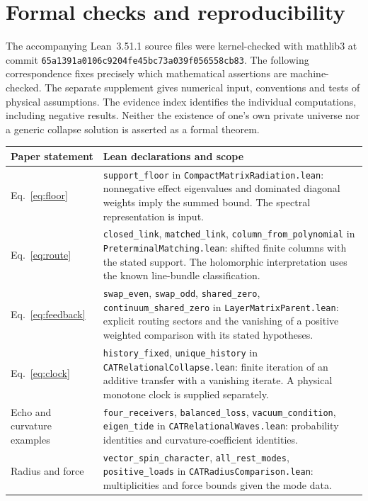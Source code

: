 \appendix
\section{Formal checks and reproducibility}\label{sec:verification}
The accompanying Lean~3.51.1 source files were kernel-checked with mathlib3 at commit \texttt{65a1391a0106c9204fe45bc73a039f056558cb83}. The following correspondence fixes precisely which mathematical assertions are machine-checked. The separate supplement gives numerical input, conventions and tests of physical assumptions. The evidence index identifies the individual computations, including negative results. Neither the existence of one's own private universe nor a generic collapse solution is asserted as a formal theorem.

\begin{center}\small
\begin{tabularx}{\linewidth}{@{}L{.22\linewidth}X@{}}\toprule
Paper statement & Lean declarations and scope\\\midrule
Eq.~\eqref{eq:floor} & \texttt{support\_floor} in \texttt{CompactMatrixRadiation.lean}: nonnegative effect eigenvalues and dominated diagonal weights imply the summed bound. The spectral representation is input.\\
Eq.~\eqref{eq:route} & \texttt{closed\_link}, \texttt{matched\_link}, \texttt{column\_from\_polynomial} in \texttt{PreterminalMatching.lean}: shifted finite columns with the stated support. The holomorphic interpretation uses the known line-bundle classification.\\
Eq.~\eqref{eq:feedback} & \texttt{swap\_even}, \texttt{swap\_odd}, \texttt{shared\_zero}, \texttt{continuum\_shared\_zero} in \texttt{LayerMatrixParent.lean}: explicit routing sectors and the vanishing of a positive weighted comparison with its stated hypotheses.\\
Eq.~\eqref{eq:clock} & \texttt{history\_fixed}, \texttt{unique\_history} in \texttt{CATRelationalCollapse.lean}: finite iteration of an additive transfer with a vanishing iterate. A physical monotone clock is supplied separately.\\
Echo and curvature examples & \texttt{four\_receivers}, \texttt{balanced\_loss}, \texttt{vacuum\_condition}, \texttt{eigen\_tide} in \texttt{CATRelationalWaves.lean}: probability identities and curvature-coefficient identities.\\
Radius and force & \texttt{vector\_spin\_character}, \texttt{all\_rest\_modes}, \texttt{positive\_loads} in \texttt{CATRadiusComparison.lean}: multiplicities and force bounds given the mode data.\\

\end{tabularx}
\end{center}
